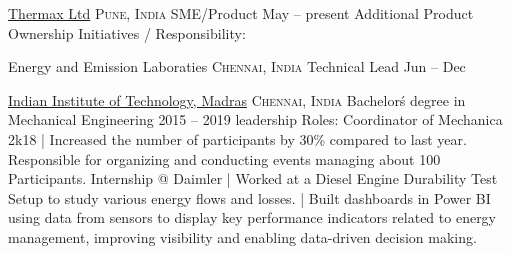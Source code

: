 \documentclass[10pt,a4paper]{article}
\begin{document}
\vspace{-1.25em}
\begin{multicols}{3}
	
\end{multicols}
\spacedhrule{-0.1em}{-0.4em}



\headedsection  %
{\href{https://www.thermaxglobal.com/}{Thermax Ltd}}
{\textsc{Pune, India}} {%
	\headedsubsection
	{SME/Product}
	{May  -- present}
	{
		\bodytext{
			
		}
	}
	\headedsubsection
	{Additional Product Ownership Initiatives / Responsibility:}
	{}
	{
	}
}

\headedsection  %
{Energy and Emission Laboraties}
{\textsc{Chennai, India}} {%
	\headedsubsection
	{Technical Lead}
	{Jun  -- Dec }
	{\bodytext{}}
}

\vspace{1em}
\spacedhrule{-0.2em}{-0.4em}


\headedsection
{\href{http://www.eur.nl/english}{Indian Institute of Technology, Madras}}
{\textsc{Chennai, India}} {%
	\headedsubsection
	{Bachelor\'s degree in Mechanical Engineering}
	{2015 -- 2019}
	{}
	\headedsubsection
	{leadership Roles:}{}{
		\newline Coordinator of Mechanica 2k18
		\newline | Increased the number of participants by 30\% compared to last year. Responsible for organizing and conducting events managing about 100 Participants.
	}
	\headedsubsection
	{Internship @ Daimler}{}{
		\newline | Worked at a Diesel Engine Durability Test Setup to study various energy flows and losses.
		\newline | Built dashboards in Power BI using data from sensors to display key performance indicators related to energy management, improving visibility and enabling data-driven decision making.
	}
}
\end{document}
